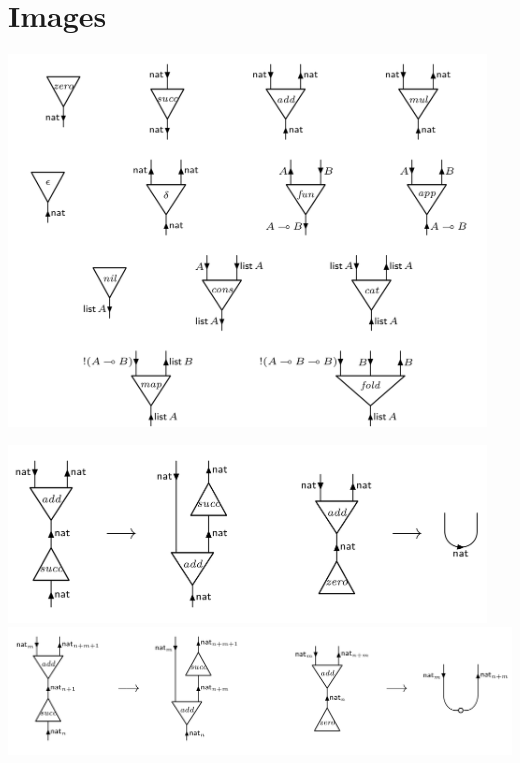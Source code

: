 \documentclass{fit-teorsem}
\begin{document}
\maketsheader
\thispagestyle{empty}

\section*{Images}
\begin{minipage}{.45\textwidth}
	\includegraphics[width=0.95\textwidth]{inet-nodes}
	\label{fig:inet-nodes}
\end{minipage} %
\begin{minipage}{.55\textwidth}
	\includegraphics[width=0.95\textwidth]{inet-addition}
	\label{fig:inet-addition}
	\includegraphics[width=1.1\textwidth]{inet-sized-addition}
	\label{fig:inet-sized-addition}
\end{minipage}
\end{document}
